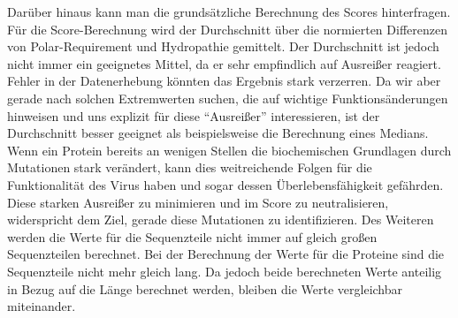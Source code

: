 \documentclass[german,version-2022-01]{uzl-thesis}
\begin{document}
Dar\"uber hinaus kann man die grunds\"atzliche Berechnung des Scores hinterfragen. F\"ur die Score-Berechnung wird der Durchschnitt \"uber die normierten Differenzen von Polar-Requirement und Hydropathie gemittelt. Der Durchschnitt ist jedoch nicht immer ein geeignetes Mittel, da er sehr empfindlich auf Ausrei\ss{}er reagiert. Fehler in der Datenerhebung k\"onnten das Ergebnis stark verzerren. Da wir aber gerade nach solchen Extremwerten suchen, die auf wichtige Funktions\"anderungen hinweisen und uns explizit f\"ur diese "`Ausrei\ss{}er"' interessieren, ist der Durchschnitt besser geeignet als beispielsweise die Berechnung eines Medians. Wenn ein Protein bereits an wenigen Stellen die biochemischen Grundlagen durch Mutationen stark ver\"andert, kann dies weitreichende Folgen f\"ur die Funktionalit\"at des Virus haben und sogar dessen \"Uberlebensf\"ahigkeit gef\"ahrden. Diese starken Ausrei\ss{}er zu minimieren und im Score zu neutralisieren, widerspricht dem Ziel, gerade diese Mutationen zu identifizieren. Des Weiteren werden die Werte f\"ur die Sequenzteile nicht immer auf gleich gro\ss{}en Sequenzteilen berechnet. Bei der Berechnung der Werte f\"ur die Proteine sind die Sequenzteile nicht mehr gleich lang. Da jedoch beide berechneten Werte anteilig in Bezug auf die L\"ange berechnet werden, bleiben die Werte vergleichbar miteinander.
\end{document}
